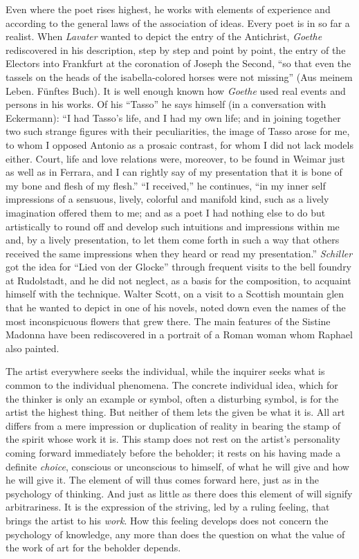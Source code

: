 \documentclass[12pt,a4paper]{book}
\newcommand{\opage}[1]{\marginnote{\footnotesize\textit{[#1]}}}
\begin{document}
Even where the poet rises highest, he works with elements of experience
and according to the general laws of the association of ideas. Every
poet is in so far a realist. When \emph{Lavater} wanted to depict the
entry of the Antichrist, \emph{Goethe} rediscovered in his description,
step by step and point by point, the entry of the Electors into
Frankfurt at the coronation of Joseph the Second, ``so that even the
tassels on the heads of the isabella-colored horses were not missing''
(Aus meinem Leben. Fünftes Buch). It is well enough known how
\emph{Goethe} used real events and persons in his works. Of his
``Tasso'' he says himself (in a conversation with Eckermann): ``I had
Tasso's life, and I had my own life; and in joining together two such
strange figures with their peculiarities, the image of Tasso arose for
me, to whom I opposed Antonio as a prosaic contrast, for whom I did not
lack models either. Court, life and love relations were, moreover, to be
found in Weimar just as well as in Ferrara, and I can rightly say of my
presentation that it is bone of my bone and flesh of my flesh.'' ``I
received,'' he continues, ``in my inner self impressions of a sensuous,
lively, colorful and manifold kind, such as a lively imagination offered
them to me; and as a poet I had nothing else to do but artistically to
round off and develop such intuitions and impressions within me and, by
a
\opage{225}lively presentation, to let them come forth in such a way
that others received the same impressions when they heard or read my
presentation.'' \emph{Schiller} got the idea for ``Lied von der Glocke''
through frequent visits to the bell foundry at Rudolstadt, and he did
not neglect, as a basis for the composition, to acquaint himself with
the technique. Walter Scott, on a visit to a Scottish mountain glen that
he wanted to depict in one of his novels, noted down even the names of
the most inconspicuous flowers that grew there. The main features of the
Sistine Madonna have been rediscovered in a portrait of a Roman woman
whom Raphael also painted.

The artist everywhere seeks the individual, while the inquirer seeks
what is common to the individual phenomena. The concrete individual
idea, which for the thinker is only an example or symbol, often a
disturbing symbol, is for the artist the highest thing. But neither of
them lets the given be what it is. All art differs from a mere
impression or duplication of reality in bearing the stamp of the spirit
whose work it is. This stamp does not rest on the artist's personality
coming forward immediately before the beholder; it rests on his having
made a definite \emph{choice}, conscious or unconscious to himself, of
what he will give and how he will give it. The element of will thus
comes forward here, just as in the psychology of thinking. And just as
little as there does this element of will signify arbitrariness. It is
the expression of the striving, led by a ruling feeling, that brings the
artist to his \emph{work}. How this feeling develops does not concern
the psychology of knowledge, any more than does the question on what the
value of the work of art for the beholder depends.
\end{document}
